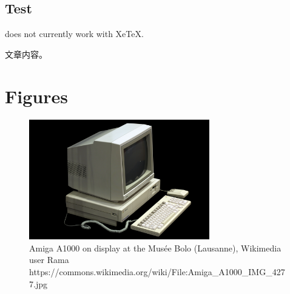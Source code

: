 \documentclass{jlcl}
\begin{document}
\subsection{Test}

\ifxetex
does not currently work with XeTeX.
\else
\begin{CJK*}{UTF8}{gbsn}
文章内容。
\end{CJK*}
\fi


\section{Figures}

\begin{figure}[h]
\centering
\includegraphics[width=0.7\textwidth]{Amiga_A1000.jpg}
\caption{Amiga A1000 on display at the Mus\'{e}e Bolo (Lausanne), Wikimedia user Rama \newline https://commons.wikimedia.org/wiki/File:Amiga\_A1000\_IMG\_4277.jpg}
\end{figure}



\nocite{*}



\end{document}
